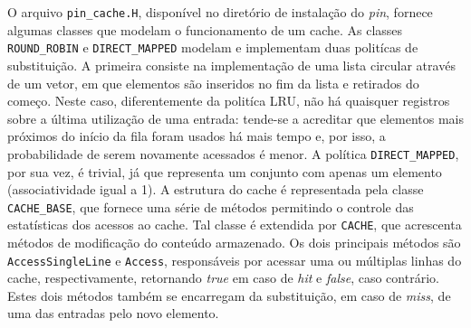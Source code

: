 \documentclass[12pt]{article}
\begin{document}
O arquivo \texttt{pin\_cache.H}, disponível no diretório de instalação do
\textit{pin}, fornece algumas classes que modelam o funcionamento de um cache.
As classes \texttt{ROUND\_ROBIN} e \texttt{DIRECT\_MAPPED} modelam  e
implementam duas politícas de substituição. A primeira consiste na implementação
de uma lista circular através de um vetor, em que elementos são inseridos no fim
da lista e retirados do começo. Neste caso, diferentemente da politíca LRU, não há
quaisquer registros sobre a última utilização de uma entrada: tende-se a
acreditar que elementos mais próximos do início da fila foram usados há mais
tempo e, por isso, a probabilidade de serem novamente acessados é menor. A
política \texttt{DIRECT\_MAPPED}, por sua vez, é trivial, já que representa um
conjunto com apenas um elemento (associatividade igual a 1). A estrutura do
cache é representada pela classe \texttt{CACHE\_BASE}, que fornece uma série de
métodos permitindo o controle das estatísticas dos acessos ao cache. Tal classe
é extendida por \texttt{CACHE}, que acrescenta métodos de modificação do conteúdo
armazenado. Os dois principais métodos são \texttt{AccessSingleLine} e
\texttt{Access}, responsáveis por acessar uma ou múltiplas linhas do cache,
respectivamente, retornando \textit{true} em caso de \textit{hit} e
\textit{false}, caso contrário. Estes dois métodos também se encarregam da
substituição, em caso de \textit{miss}, de uma das entradas pelo novo elemento.
\end{document}
